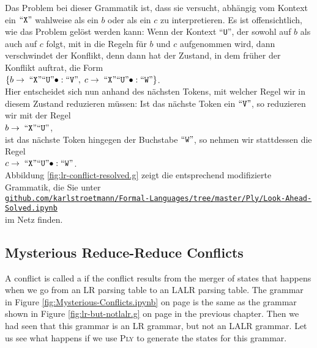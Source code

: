 Das Problem bei dieser Grammatik ist, dass sie versucht, abh\"angig vom Kontext ein $\mbox{``\texttt{X}''}$ wahlweise
als ein $b$ oder als ein $c$ zu interpretieren.  Es ist offensichtlich, wie das Problem gel\"ost werden
kann:  Wenn der Kontext ``\texttt{U}'', der sowohl auf $b$ als auch auf $c$ folgt, mit in
die Regeln f\"ur $b$ und $c$ aufgenommen wird, dann verschwindet der Konflikt, denn dann hat der
Zustand, in dem fr\"uher der Konflikt auftrat, die Form
\\[0.2cm]
\hspace*{1.3cm}
$\{ b \rightarrow \;\mbox{``\texttt{X}''} \mbox{``\texttt{U}''}\bullet: \mbox{``\texttt{V}''},\; 
    c \rightarrow \;\mbox{``\texttt{X}''} \mbox{``\texttt{U}''}\bullet: \mbox{``\texttt{W}''} 
\}
$.
\\[0.2cm]  
Hier entscheidet sich nun anhand des n\"achsten Tokens, mit welcher Regel wir in diesem Zustand
reduzieren m\"ussen:  Ist das n\"achste Token ein $\mbox{``\texttt{V}''}$, so reduzieren wir mit der Regel
\\[0.2cm]
\hspace*{1.3cm}
$b \rightarrow \;\mbox{``\texttt{X}''} \mbox{``\texttt{U}''}$,
\\[0.2cm]
ist das n\"achste Token hingegen der Buchstabe $\mbox{``\texttt{W}''}$, so nehmen wir stattdessen die Regel
\\[0.2cm]
\hspace*{1.3cm}
$c \rightarrow \;\mbox{``\texttt{X}''} \mbox{``\texttt{U}''}\bullet: \mbox{``\texttt{W}''}$.
\\[0.2cm]
Abbildung
\ref{fig:lr-conflict-resolved.g} zeigt die entsprechend modifizierte Grammatik, die Sie unter
\\[0.2cm]
\hspace*{1.3cm}
\href{https://github.com/karlstroetmann/Formal-Languages/tree/master/Ply/Look-Ahead-Solved.ipynb}{\texttt{github.com/karlstroetmann/Formal-Languages/tree/master/Ply/Look-Ahead-Solved.ipynb}}
\\[0.2cm]
im Netz finden.


\subsection{Mysterious Reduce-Reduce Conflicts}
A conflict is called a   if the conflict results from the merger of
states that happens when we go from an LR parsing table to an LALR parsing table.  The grammar in Figure
\ref{fig:Mysterious-Conflicts.ipynb} on page \pageref{fig:Mysterious-Conflicts.ipynb} is the same as the
grammar shown in Figure \ref{fig:lr-but-notlalr.g} on page \pageref{fig:lr-but-notlalr.g} in the previous
chapter.  Then we had seen that this grammar is an LR grammar, but not an LALR grammar.  Let us see what happens
if we use \textsc{Ply} to generate the states for this grammar.

